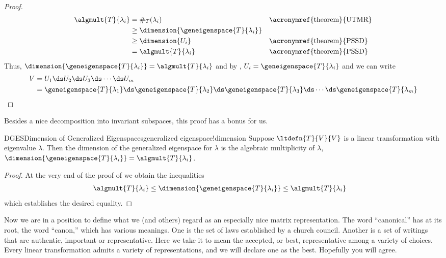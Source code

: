 \begin{proof}
%
\begin{align*}
\algmult{T}{\lambda_i}
&=\#_T(\lambda_i)&&\text{\acronymref{theorem}{UTMR}}\\
&\geq\dimension{\geneigenspace{T}{\lambda_i}}\\
&\geq\dimension{U_i}&&\text{\acronymref{theorem}{PSSD}}\\
&=\algmult{T}{\lambda_i}&&\text{\acronymref{theorem}{PSSD}}\\
\end{align*}
%
Thus, $\dimension{\geneigenspace{T}{\lambda_i}}=\algmult{T}{\lambda_i}$ and by
, $U_i=\geneigenspace{T}{\lambda_i}$ and we can write
%
\begin{align*}
V&=U_1\ds U_2\ds U_3\ds\cdots\ds U_m\\
&=
\geneigenspace{T}{\lambda_1}\ds
\geneigenspace{T}{\lambda_2}\ds
\geneigenspace{T}{\lambda_3}\ds
\cdots\ds
\geneigenspace{T}{\lambda_m}
\end{align*}
%
\end{proof}
%
Besides a nice decomposition into invariant subspaces, this proof has a bonus for us.
%
\begin{theorem}{DGES}{Dimension of Generalized Eigenspaces}{generalized eigenspace!dimension}
Suppose $\ltdefn{T}{V}{V}$ is a linear transformation with eigenvalue $\lambda$.  Then the dimension of the generalized eigenspace for $\lambda$ is the algebraic multiplicity of $\lambda$, $\dimension{\geneigenspace{T}{\lambda_i}}=\algmult{T}{\lambda_i}$.
\end{theorem}
%
\begin{proof}
At the very end of the proof of  we obtain the inequalities
%
\begin{align*}
\algmult{T}{\lambda_i}
&\leq\dimension{\geneigenspace{T}{\lambda_i}}
\leq\algmult{T}{\lambda_i}
\end{align*}
%
which establishes the desired equality.
%
\end{proof}
%
%
Now we are in a position to define what we (and others) regard as an especially nice matrix representation.  The word ``canonical'' has at its root, the word ``canon,'' which has various meanings.  One is the set of laws established by a church council.  Another is a set of writings that are authentic, important or representative.  Here we take it to mean the accepted, or best, representative among a variety of choices.  Every linear transformation admits a variety of representations, and we will declare one as the best.  Hopefully you will agree.
